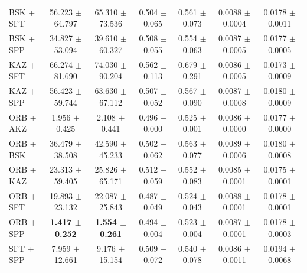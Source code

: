 \begin{table}[hbp]
\begin{tabular}{lcccccc}
BSK + SFT & 56.223 $\pm$ 64.797 & 65.310 $\pm$ 73.536 & 0.504 $\pm$ 0.065 & 0.561 $\pm$ 0.073 & 0.0088 $\pm$ 0.0004 & 0.0178 $\pm$ 0.0011 \\
BSK + SPP & 34.827 $\pm$ 53.094 & 39.610 $\pm$ 60.327 & 0.508 $\pm$ 0.055 & 0.554 $\pm$ 0.063 & 0.0087 $\pm$ 0.0005 & 0.0177 $\pm$ 0.0005 \\
KAZ + SFT & 66.274 $\pm$ 81.690 & 74.030 $\pm$ 90.204 & 0.562 $\pm$ 0.113 & 0.679 $\pm$ 0.291 & 0.0086 $\pm$ 0.0005 & 0.0173 $\pm$ 0.0009 \\
KAZ + SPP & 56.423 $\pm$ 59.744 & 63.630 $\pm$ 67.112 & 0.507 $\pm$ 0.052 & 0.567 $\pm$ 0.090 & 0.0087 $\pm$ 0.0008 & 0.0180 $\pm$ 0.0009 \\
ORB + AKZ & 1.956 $\pm$ 0.425 & 2.108 $\pm$ 0.441 & 0.496 $\pm$ 0.000 & 0.525 $\pm$ 0.001 & 0.0086 $\pm$ 0.0000 & 0.0177 $\pm$ 0.0000 \\
ORB + BSK & 36.479 $\pm$ 38.508 & 42.590 $\pm$ 45.233 & 0.502 $\pm$ 0.062 & 0.563 $\pm$ 0.077 & 0.0089 $\pm$ 0.0006 & 0.0180 $\pm$ 0.0008 \\
ORB + KAZ & 23.313 $\pm$ 59.405 & 25.826 $\pm$ 65.171 & 0.512 $\pm$ 0.059 & 0.552 $\pm$ 0.083 & 0.0085 $\pm$ 0.0001 & 0.0175 $\pm$ 0.0001 \\
ORB + SFT & 19.893 $\pm$ 23.132 & 22.087 $\pm$ 25.843 & 0.487 $\pm$ 0.049 & 0.524 $\pm$ 0.043 & 0.0088 $\pm$ 0.0001 & 0.0178 $\pm$ 0.0001 \\
ORB + SPP & \textbf{1.417 $\pm$ 0.252} & \textbf{1.554 $\pm$ 0.261} & 0.494 $\pm$ 0.004 & 0.523 $\pm$ 0.004 & 0.0087 $\pm$ 0.0001 & 0.0178 $\pm$ 0.0003 \\
SFT + SPP & 7.959 $\pm$ 12.661 & 9.176 $\pm$ 15.154 & 0.509 $\pm$ 0.072 & 0.540 $\pm$ 0.078 & 0.0086 $\pm$ 0.0011 & 0.0194 $\pm$ 0.0068 \\
\bottomrule
\end{tabular}
\end{table}